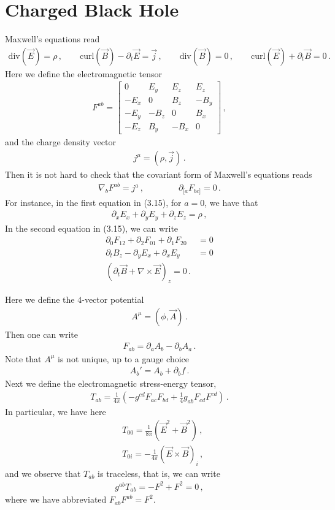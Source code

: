 \documentclass[11pt, onesided]{book}
\theoremstyle{break}
\theoremstyle{break}
\newcommand{\pd}{\partial}
\newcommand{\bmat}[1]{\begin{bmatrix} #1 \end{bmatrix}}
\begin{document}
\section[Charged Black Hole]{\color{red}Charged Black Hole\color{black}}
Maxwell's equations read
\begin{align*}
\text{div}(\vec{E}) = \rho \,,\qquad
\text{curl}(\vec{B}) - \pd_t \vec{E} = \vec{j}\,,\qquad
\text{div}(\vec{B}) = 0 \,,\qquad
\text{curl}(\vec{E}) + \pd_t\vec{B} = 0\,.
\end{align*}
Here we define the electromagnetic tensor
\begin{align*}
F^{ab} = \bmat{0 & E_y & E_z & E_z \\ 
-E_x & 0 & B_z & -B_y\\
-E_y & -B_z & 0 & B_x \\
-E_z & B_y & -B_x & 0}\,,
\end{align*}
and the charge density vector
\begin{align*}
j^\mu = (\rho , \vec{j})\,.
\end{align*}
Then it is not hard to check that the covariant form of Maxwell's equations reads
\begin{align}
\nabla_b F^{ab} = j^a\,,\qquad\qquad
\pd_{[a}F_{bc]} = 0\,.
\end{align}
For instance, in the first equation in (3.15), for $a=0$, we have that
\begin{align*}
\pd_x E_x + \pd_y E_y + \pd_z E_z = \rho\,,
\end{align*}
In the second equation in (3.15), we can write
\begin{align*}
\pd_0 F_{12} + \pd_2 F_{01} + \pd_1 F_{20} &= 0\\
\pd_t B_z - \pd_y E_x + \pd_x E_y &= 0\\
(\pd_t\vec{B}+ \nabla \times \vec{E})_z = 0\,.
\end{align*}

Here we define the $4$-vector potential
\begin{align*}
A^\mu = ( \phi, \vec{A}) \,.
\end{align*}
Then one can write
\begin{align*}
F_{ab} = \pd_a A_b - \pd_b A_a\,.
\end{align*}
Note that $A^\mu$ is not unique, up to a gauge choice
\begin{align*}
A_b ' = A_b + \pd_b f\,.
\end{align*}
Next we define the electromagnetic stress-energy tensor,
\begin{align*}
T_{ab} = \frac{1}{4\pi}\left( -g^{cd}F_{ac}F_{bd} + \frac{1}{4}g_{ab}F_{cd}F^{cd}\right)\,.
\end{align*}
In particular, we have here
\begin{align*}
&T_{00} = \frac{1}{8\pi}(\vec{E}^2 + \vec{B}^2)\,,\\
&T_{0i} = -\frac{1}{4\pi}(\vec{E}\times \vec{B})_i\,,
\end{align*}
and we observe that $T_{ab}$ is traceless, that is, we can write
\begin{align*}
g^{ab}T_{ab} = -F^2 + F^2 = 0\,,
\end{align*}
where we have abbreviated $F_{ab}F^{ab} = F^2$. \\
\end{document}
